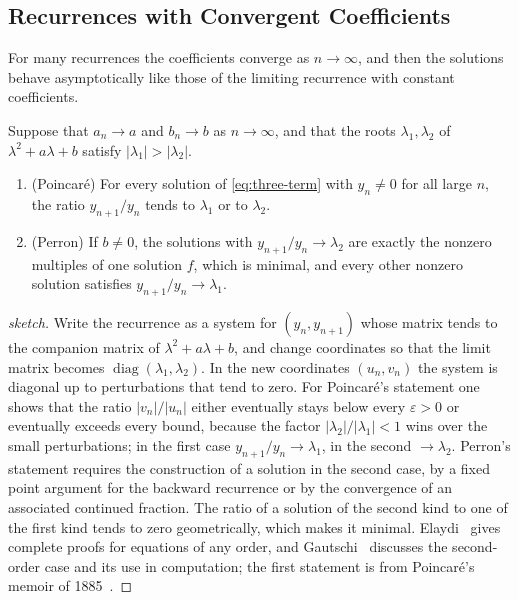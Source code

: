 \subsection{Recurrences with Convergent Coefficients}

For many recurrences the coefficients converge as $n\to\infty$, and then the solutions behave asymptotically like those of the limiting recurrence with constant coefficients.

\begin{theorem}
\label{thm:poincare-perron}
Suppose that $a_n\to a$ and $b_n\to b$ as $n\to\infty$, and that the roots $\lambda_1,\lambda_2$ of $\lambda^2+a\lambda+b$ satisfy $|\lambda_1|>|\lambda_2|$.
\begin{enumerate}
\item (Poincar\'e) For every solution of \eqref{eq:three-term} with $y_n\ne0$ for all large $n$, the ratio $y_{n+1}/y_n$ tends to $\lambda_1$ or to $\lambda_2$.
\item (Perron) If $b\ne0$, the solutions with $y_{n+1}/y_n\to\lambda_2$ are exactly the nonzero multiples of one solution $f$, which is minimal, and every other nonzero solution satisfies $y_{n+1}/y_n\to\lambda_1$.
\end{enumerate}
\end{theorem}

\begin{proof}[sketch]
Write the recurrence as a system for $(y_n,y_{n+1})$ whose matrix tends to the companion matrix of $\lambda^2+a\lambda+b$, and change coordinates so that the limit matrix becomes $\operatorname{diag}(\lambda_1,\lambda_2)$. In the new coordinates $(u_n,v_n)$ the system is diagonal up to perturbations that tend to zero. For Poincar\'e's statement one shows that the ratio $|v_n|/|u_n|$ either eventually stays below every $\varepsilon>0$ or eventually exceeds every bound, because the factor $|\lambda_2|/|\lambda_1|<1$ wins over the small perturbations; in the first case $y_{n+1}/y_n\to\lambda_1$, in the second $\to\lambda_2$. Perron's statement requires the construction of a solution in the second case, by a fixed point argument for the backward recurrence or by the convergence of an associated continued fraction. The ratio of a solution of the second kind to one of the first kind tends to zero geometrically, which makes it minimal. Elaydi~\cite[Chap.~8]{elaydi2005} gives complete proofs for equations of any order, and Gautschi~\cite{gautschi1967} discusses the second-order case and its use in computation; the first statement is from Poincar\'e's memoir of 1885~\cite{poincare1885}.
\end{proof}

